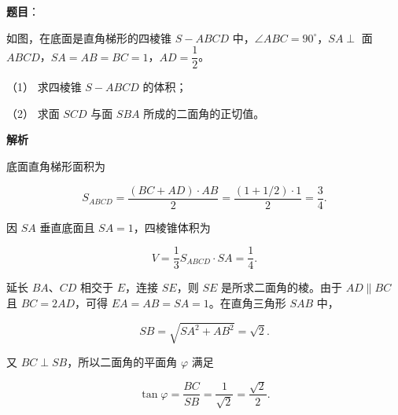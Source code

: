 \begin{answer}

\textbf{题目}：

如图，在底面是直角梯形的四棱锥 $S-ABCD$ 中，$\angle ABC=90^\circ$，$SA\perp$ 面 $ABCD$，$SA=AB=BC=1$，$AD=\dfrac12$。
\nopagebreak[4]
\begin{center}\end{center}
\nopagebreak[4]
（1） 求四棱锥 $S-ABCD$ 的体积；

（2） 求面 $SCD$ 与面 $SBA$ 所成的二面角的正切值。

\textbf{解析}


底面直角梯形面积为

\nopagebreak[4]
\[
S_{ABCD}=\frac{(BC+AD)\cdot AB}{2}
=\frac{(1+1/2)\cdot1}{2}
=\frac34.
\]

因 $SA$ 垂直底面且 $SA=1$，四棱锥体积为

\nopagebreak[4]
\[
V=\frac13S_{ABCD}\cdot SA=\frac14.
\]


延长 $BA$、$CD$ 相交于 $E$，连接 $SE$，则 $SE$ 是所求二面角的棱。由于 $AD\parallel BC$ 且 $BC=2AD$，可得 $EA=AB=SA=1$。在直角三角形 $SAB$ 中，

\nopagebreak[4]
\[
SB=\sqrt{SA^2+AB^2}=\sqrt2.
\]

又 $BC\perp SB$，所以二面角的平面角 $\varphi$ 满足

\nopagebreak[4]
\[
\tan\varphi=\frac{BC}{SB}=\frac1{\sqrt2}=\frac{\sqrt2}{2}.
\]



\end{answer}
